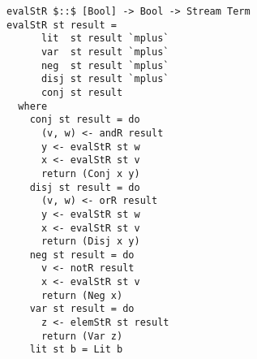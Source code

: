 

\begin{figure}[!t]
  \centering
  \begin{minipage}{0.49\textwidth}
    \begin{lstlisting}[label={eval_st_r}, caption={Functional implementation of the direction \lstinline{evalo out in in}}, captionpos=b, frame=tb]
evalStR $::$ [Bool] -> Bool -> Stream Term
evalStR st result =
      lit  st result `mplus`
      var  st result `mplus`
      neg  st result `mplus`
      disj st result `mplus`
      conj st result
  where
    conj st result = do
      (v, w) <- andR result
      y <- evalStR st w
      x <- evalStR st v
      return (Conj x y)
    disj st result = do
      (v, w) <- orR result
      y <- evalStR st w
      x <- evalStR st v
      return (Disj x y)
    neg st result = do
      v <- notR result
      x <- evalStR st v
      return (Neg x)
    var st result = do
      z <- elemStR st result
      return (Var z)
    lit st b = Lit b
    \end{lstlisting}
  \end{minipage}
\end{figure}


